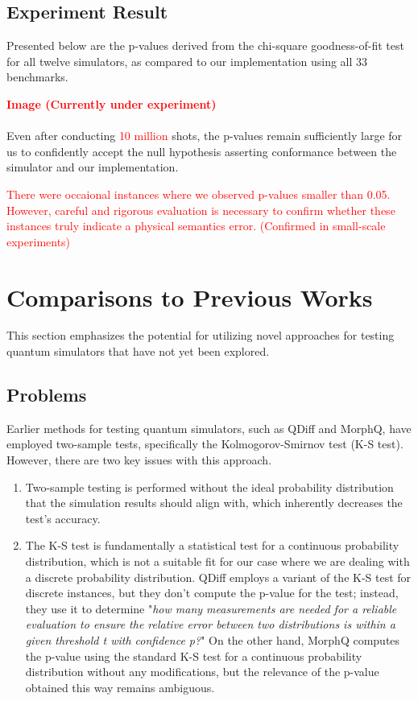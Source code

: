 \documentclass[10pt,a4paper]{article}
\newcommand{\<}{\langle}
\renewcommand{\>}{\rangle}
\newcommand{\red}[1]{\textcolor{red}{#1}}
\begin{document}
\subsection{Experiment Result}

Presented below are the p-values derived from the chi-square goodness-of-fit test for all twelve
simulators, as compared to our implementation using all 33 benchmarks.

\textbf{\red{Image (Currently under experiment)}}
\\
\\
Even after conducting \red{10 million} shots, the p-values remain sufficiently large for us to
confidently accept the null hypothesis asserting conformance between the simulator and our
implementation.

\red{
There were occaional instances where we observed p-values smaller than 0.05.  However, careful and
rigorous evaluation is necessary to confirm whether these instances truly indicate a physical
semantics error. (Confirmed in small-scale experiments)
}




\section{Comparisons to Previous Works}

This section emphasizes the potential for utilizing novel approaches for testing quantum simulators
that have not yet been explored.

\subsection{Problems}
Earlier methods for testing quantum simulators, such as QDiff and MorphQ, have employed two-sample
tests, specifically the Kolmogorov-Smirnov test (K-S test).
However, there are two key issues with this approach.

\begin{enumerate}
  \item
    Two-sample testing is performed without the ideal probability distribution that the simulation
    results should align with, which inherently decreases the test's accuracy.
  \item
    The K-S test is fundamentally a statistical test for a continuous probability distribution,
    which is not a suitable fit for our case where we are dealing with a discrete probability
    distribution. QDiff employs a variant of the K-S test for discrete instances, but they don't
    compute the p-value for the test; instead, they use it to determine "\textit{how many
    measurements are needed for a reliable evaluation to ensure the relative error between two
    distributions is within a given threshold t with confidence p?}" On the other hand, MorphQ
    computes the p-value using the standard K-S test for a continuous probability distribution without
    any modifications, but the relevance of the p-value obtained this way remains ambiguous.
\end{enumerate}
\end{document}
